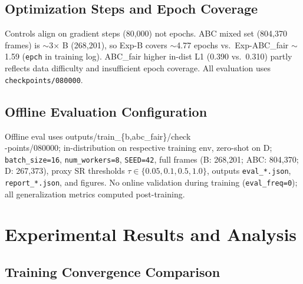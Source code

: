 \documentclass[10pt,twocolumn,letterpaper]{article}
\begin{document}
\subsection{Optimization Steps and Epoch Coverage}

Controls align on gradient steps (80{,}000) not epochs. ABC mixed set (804{,}370 frames) is $\sim$3$\times$ B (268{,}201), so Exp-B covers $\sim$4.77 epochs vs.\ Exp-ABC\_fair $\sim$1.59 (\texttt{epch} in training log). ABC\_fair higher in-dist L1 (0.390 vs.\ 0.310) partly reflects data difficulty and insufficient epoch coverage. All evaluation uses \texttt{checkpoints/080000}.

\subsection{Offline Evaluation Configuration}
\label{sec:metrics-offline}

Offline eval uses outputs/train\_\{b,abc\_fair\}/check\\-points/080000; in-distribution on respective training env, zero-shot on D; \texttt{batch\_size=16}, \texttt{num\_workers=8}, \texttt{SEED=42}, full frames (B: 268{,}201; ABC: 804{,}370; D: 267{,}373), proxy SR thresholds $\tau\in\{0.05,0.1,0.5,1.0\}$, outputs \texttt{eval\_*.json}, \texttt{report\_*.json}, and figures. No online validation during training (\texttt{eval\_freq=0}); all generalization metrics computed post-training.

\section{Experimental Results and Analysis}

\subsection{Training Convergence Comparison}
\end{document}
